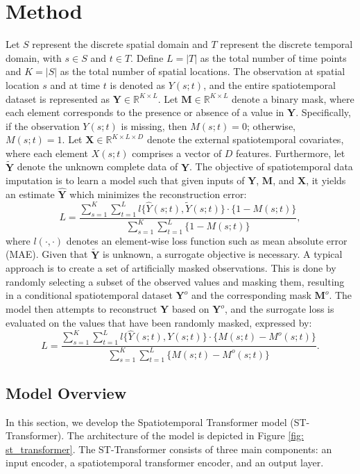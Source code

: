 \documentclass[11pt]{article}
\begin{document}
\section{Method}\label{sec: method}
Let $S$ represent the discrete spatial domain and $T$ represent the discrete temporal domain, with $s \in S$ and $t \in T$. Define $L=|T|$ as the total number of time points and $K=|S|$ as the total number of spatial locations. The observation at spatial location $s$ and at time $t$ is denoted as $Y(s;t)$, and the entire spatiotemporal dataset is represented as $\boldsymbol{Y} \in \mathbb{R}^{K\times L}$.
 Let $\boldsymbol{M} \in \mathbb{R}^{K \times L}$ denote a binary mask, where each element corresponds to the presence or absence of a value in $\boldsymbol{Y}$. Specifically, if the observation $Y(s;t)$ is missing, then $M(s;t) = 0$; otherwise, $M(s;t) = 1$. Let $\boldsymbol{X} \in \mathbb{R}^{K \times L \times D}$ denote the external spatiotemporal covariates, where each element $X(s;t)$ comprises a vector of $D$ features. Furthermore, let $\tilde{\boldsymbol{Y}}$ denote the unknown complete data of $\boldsymbol{Y}$. The objective of spatiotemporal data imputation is to learn a model such that given inputs of $\boldsymbol{Y}$, $\boldsymbol{M}$, and $\boldsymbol{X}$, it yields an estimate $\hat{\boldsymbol{Y}}$ which minimizes the reconstruction error:
\begin{equation}
	L = \frac{\sum_{s=1}^K \sum_{t=1}^L l\{\hat{Y}(s;t), \tilde{Y}(s;t)\} \cdot \{1-M(s;t)\}}{\sum_{s=1}^{K}\sum_{t=1}^{L}\{1-M(s;t)\}},
\end{equation}
where $l(\cdot, \cdot)$ denotes an element-wise loss function such as mean absolute error (MAE). Given that $\tilde{\boldsymbol{Y}}$ is unknown, a surrogate objective is necessary. A typical approach is to create a set of artificially masked observations. This is done by randomly selecting a subset of the observed values and masking them, resulting in a conditional spatiotemporal dataset $\boldsymbol{Y}^{o}$ and the corresponding mask $\boldsymbol{M}^{o}$. The model then attempts to reconstruct $\boldsymbol{Y}$ based on $\boldsymbol{Y}^{o}$, and the surrogate loss is evaluated on the values that have been randomly masked, expressed by:
\begin{equation}
	L = \frac{\sum_{s=1}^K \sum_{t=1}^L l\{\hat{Y}(s;t), Y(s;t)\} \cdot \{M(s;t)-M^{o}(s;t)\}}{\sum_{s=1}^{K}\sum_{t=1}^{L}\{M(s;t)-M^{o}(s;t)\}}.
	\label{eq: loss function}
\end{equation}


\subsection{Model Overview}
In this section, we develop the Spatiotemporal Transformer model (ST-Transformer). The architecture of the model is depicted in Figure \ref{fig: st_transformer}. The ST-Transformer consists of three main components: an input encoder, a spatiotemporal transformer encoder, and an output layer. 
\end{document}
